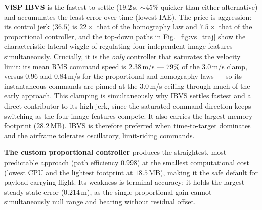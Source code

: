 \textbf{ViSP IBVS} is the fastest to settle ($19.2$\,s, ${\sim}45\%$ quicker
than either alternative) and accumulates the least error-over-time (lowest
IAE). The price is aggression: its control jerk ($36.5$) is $22\times$ that of
the homography law and $7.5\times$ that of the proportional controller, and the
top-down paths in Fig.~\ref{fig:vs_traj} show the characteristic lateral wiggle
of regulating four independent image features simultaneously. Crucially, it is
the \emph{only} controller that saturates the velocity limit: its mean RMS
command speed is $2.38$\,m/s --- $79\%$ of the $3.0$\,m/s clamp, versus
$0.96$ and $0.84$\,m/s for the proportional and homography laws --- so its
instantaneous commands are pinned at the $3.0$\,m/s ceiling through much of the
early approach. This clamping is simultaneously why IBVS settles fastest and a
direct contributor to its high jerk, since the saturated command direction
keeps switching as the four image features compete. It also carries the largest
memory footprint ($28.2$\,MB). IBVS is therefore preferred when time-to-target
dominates and the airframe tolerates oscillatory, limit-riding commands.

\textbf{The custom proportional controller} produces the straightest, most
predictable approach (path efficiency $0.998$) at the smallest computational
cost (lowest CPU and the lightest footprint at $18.5$\,MB), making it the safe
default for payload-carrying flight. Its weakness is terminal accuracy: it
holds the largest steady-state error ($0.214$\,m), as the single proportional
gain cannot simultaneously null range and bearing without residual offset.

